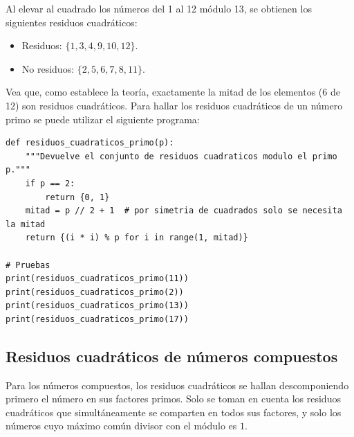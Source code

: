 \begin{ejemplo}
\end{ejemplo}
\begin{solucion}
Al elevar al cuadrado los números del 1 al 12 módulo 13, se obtienen los siguientes residuos cuadráticos:
\begin{itemize}
\item Residuos: $\{1,3,4,9,10,12\}$.
\item No residuos: $\{2,5,6,7,8,11\}$.
\end{itemize}
Vea que, como establece la teoría, exactamente la mitad de los elementos (6 de 12) son residuos cuadráticos.
Para hallar los residuos cuadráticos de un número primo se puede utilizar el siguiente programa:

\begin{verbatim}
def residuos_cuadraticos_primo(p):
    """Devuelve el conjunto de residuos cuadraticos modulo el primo p."""
    if p == 2:
        return {0, 1}
    mitad = p // 2 + 1  # por simetria de cuadrados solo se necesita la mitad
    return {(i * i) % p for i in range(1, mitad)}

# Pruebas
print(residuos_cuadraticos_primo(11))
print(residuos_cuadraticos_primo(2))
print(residuos_cuadraticos_primo(13))
print(residuos_cuadraticos_primo(17))
\end{verbatim}
\end{solucion}

\subsection{Residuos cuadráticos de números compuestos}
Para los números compuestos, los residuos cuadráticos se hallan descomponiendo primero el número en sus factores primos. Solo se toman en cuenta los residuos cuadráticos que simultáneamente se comparten en todos sus factores, y solo los números cuyo máximo común divisor con el módulo es $1$.

